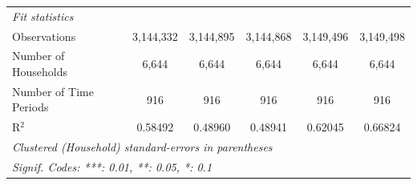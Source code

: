\begin{table}[htbp]
\begin{tabular}{lccccc}
      \emph{Fit statistics}\\
      Observations                                & 3,144,332        & 3,144,895          & 3,144,868       & 3,149,496       & 3,149,498\\  
      Number of Households                        & 6,644            & 6,644              & 6,644           & 6,644           & 6,644\\  
      Number of Time Periods                      & 916              & 916                & 916             & 916             & 916\\  
      R$^2$                                       & 0.58492          & 0.48960            & 0.48941         & 0.62045         & 0.66824\\  
      \midrule \midrule
      \multicolumn{6}{l}{\emph{Clustered (Household) standard-errors in parentheses}}\\
      \multicolumn{6}{l}{\emph{Signif. Codes: ***: 0.01, **: 0.05, *: 0.1}}\\
   \end{tabular}
\end{table}



